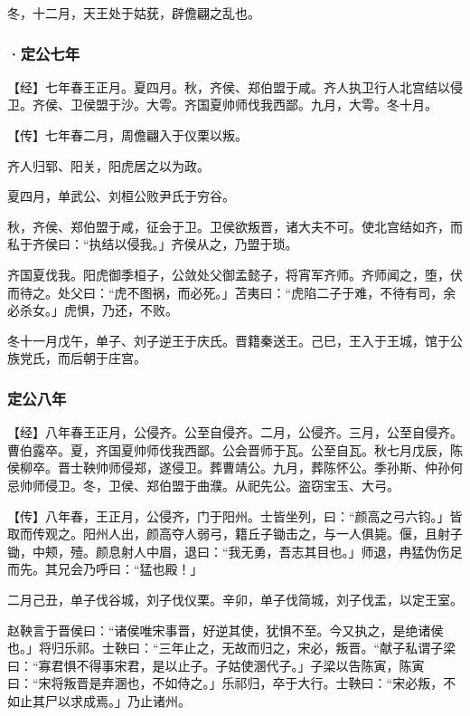 \documentclass[]{article}
\begin{document}
冬，十二月，天王处于姑莸，辟儋翩之乱也。

\hypertarget{header-n2945}{%
\subsubsection{·定公七年}\label{header-n2945}}

【经】七年春王正月。夏四月。秋，齐侯、郑伯盟于咸。齐人执卫行人北宫结以侵卫。齐侯、卫侯盟于沙。大雩。齐国夏帅师伐我西鄙。九月，大雩。冬十月。

【传】七年春二月，周儋翩入于仪栗以叛。

齐人归郓、阳关，阳虎居之以为政。

夏四月，单武公、刘桓公败尹氏于穷谷。

秋，齐侯、郑伯盟于咸，征会于卫。卫侯欲叛晋，诸大夫不可。使北宫结如齐，而私于齐侯曰：``执结以侵我。」齐侯从之，乃盟于琐。

齐国夏伐我。阳虎御季桓子，公敛处父御孟懿子，将宵军齐师。齐师闻之，堕，伏而待之。处父曰：``虎不图祸，而必死。」苫夷曰：``虎陷二子于难，不待有司，余必杀女。」虎惧，乃还，不败。

冬十一月戊午，单子、刘子逆王于庆氏。晋籍秦送王。己巳，王入于王城，馆于公族党氏，而后朝于庄宫。

\hypertarget{header-n2955}{%
\subsubsection{定公八年}\label{header-n2955}}

【经】八年春王正月，公侵齐。公至自侵齐。二月，公侵齐。三月，公至自侵齐。曹伯露卒。夏，齐国夏帅师伐我西鄙。公会晋师于瓦。公至自瓦。秋七月戊辰，陈侯柳卒。晋士鞅帅师侵郑，遂侵卫。葬曹靖公。九月，葬陈怀公。季孙斯、仲孙何忌帅师侵卫。冬，卫侯、郑伯盟于曲濮。从祀先公。盗窃宝玉、大弓。

【传】八年春，王正月，公侵齐，门于阳州。士皆坐列，曰：``颜高之弓六钧。」皆取而传观之。阳州人出，颜高夺人弱弓，籍丘子锄击之，与一人俱毙。偃，且射子锄，中颊，殪。颜息射人中眉，退曰：``我无勇，吾志其目也。」师退，冉猛伪伤足而先。其兄会乃呼曰：``猛也殿！」

二月己丑，单子伐谷城，刘子伐仪栗。辛卯，单子伐简城，刘子伐盂，以定王室。

赵鞅言于晋侯曰：``诸侯唯宋事晋，好逆其使，犹惧不至。今又执之，是绝诸侯也。」将归乐祁。士鞅曰：``三年止之，无故而归之，宋必，叛晋。``献子私谓子梁曰：``寡君惧不得事宋君，是以止子。子姑使溷代子。」子梁以告陈寅，陈寅曰：``宋将叛晋是弃溷也，不如侍之。」乐祁归，卒于大行。士鞅曰：``宋必叛，不如止其尸以求成焉。」乃止诸州。
\end{document}
